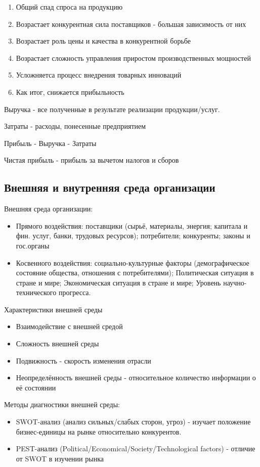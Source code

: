 \documentclass[a4paper,12pt]{report}
\begin{document}
	\begin{enumerate}
		\item	Общий спад спроса на продукцию
		\item	Возрастает конкурентная сила поставщиков - большая зависимость от них
		\item 	Возрастает роль цены и качества в конкурентной борьбе
		\item	Возрастает сложность управления приростом производственных мощностей
		\item	Усложняетса процесс внедрения товарных инноваций
		\item	Как итог, снижается прибыльность
	\end{enumerate}

	Выручка - все полученные в результате реализации продукции/услуг.

	Затраты - расходы, понесенные предприятием

	Прибыль - Выручка - Затраты

	Чистая прибыль - прибыль за вычетом налогов и сборов


\subsection{Внешняя и внутренняя среда организации}

	Внешняя среда организации:
	\begin{itemize}
		\item	Прямого воздействия: поставщики (сырьё, материалы, энергия; капитала и фин. услуг, банки,
			трудовых ресурсов); потребители; конкуренты; законы и гос.органы
		\item	Косвенного воздействия: социально-культурные факторы (демографическое состояние общества,
			отношения с потребителями); Политическая ситуация в стране и мире; Экономическая ситуация в
			стране и мире; Уровень научно-технического прогресса.
	\end{itemize}

	Характеристики внешней среды
	\begin{itemize}
		\item	Взаимодействие с внешней средой
		\item	Сложность внешней среды
		\item	Подвижность - скорость изменения отрасли
		\item	Неопределённость внешней среды - относительное количество информации о её состоянии
	\end{itemize}

	Методы диагностики внешней среды:
	\begin{itemize}
		\item	SWOT-анализ (анализ сильных/слабых сторон, угроз) - изучает положение бизнес-единицы 
			на рынке относительно конкурентов.
		\item	PEST-анализ (Political/Economical/Society/Technological factors) - отличие от SWOT в 
			изучении рынка
	\end{itemize}
\end{document}
